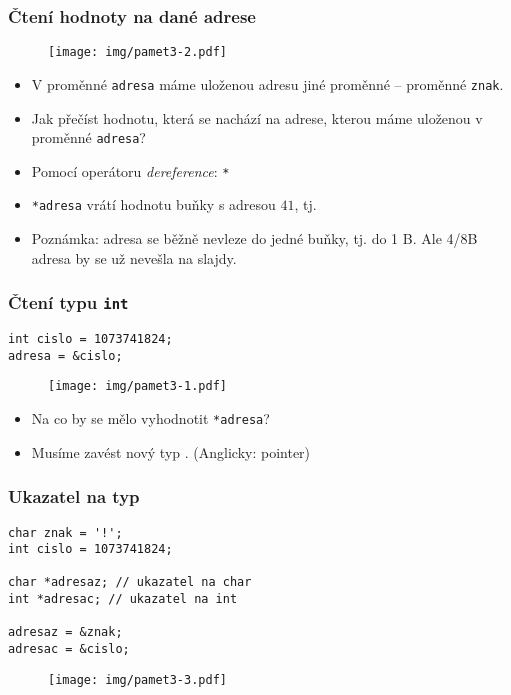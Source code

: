 \documentclass{beamer}
\newenvironment{itemizex}%
  {\large \begin{itemize}%
    \setlength{\itemsep}{8pt}%
    \setlength{\parskip}{8pt}}%
  {\end{itemize}}
\begin{document}
\begin{frame}[t,fragile]\frametitle{Čtení hodnoty na dané adrese} 
\begin{figure}[htb]
    \centering
    \texttt{[image: img/pamet3-2.pdf]}
\end{figure}

\begin{itemize}
    \item V proměnné \texttt{adresa} máme uloženou adresu jiné proměnné -- proměnné \texttt{znak}.
    \item Jak přečíst hodnotu, která se nachází na adrese, kterou máme uloženou v proměnné \texttt{adresa}?
    \item Pomocí operátoru \textit{dereference}: \texttt{*}
    \item \texttt{*adresa} vrátí hodnotu buňky s adresou $41$, tj. \uv{!}
    \item {\tiny Poznámka: adresa se běžně nevleze do jedné buňky, tj. do 1 B. Ale 4/8B adresa by se už nevešla na slajdy.}
\end{itemize}
\end{frame}



\begin{frame}[t,fragile]\frametitle{Čtení typu \texttt{int}} 
\begin{verbatim} 
int cislo = 1073741824; 
adresa = &cislo;
\end{verbatim}

\begin{figure}[htb]
    \centering
    \texttt{[image: img/pamet3-1.pdf]}
\end{figure}

\begin{itemizex}
    \item Na co by se mělo vyhodnotit \texttt{*adresa}?
    \item Musíme zavést nový typ . (Anglicky: pointer)
\end{itemizex}
\end{frame}


\begin{frame}[t,fragile]\frametitle{Ukazatel na typ} 
\begin{verbatim} 
char znak = '!';
int cislo = 1073741824;

char *adresaz; // ukazatel na char
int *adresac; // ukazatel na int

adresaz = &znak;
adresac = &cislo;
\end{verbatim}
\begin{figure}[htb]
    \centering
    \texttt{[image: img/pamet3-3.pdf]}
\end{figure}
\end{frame}
\end{document}
